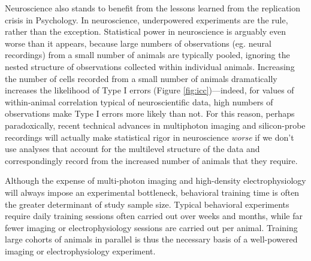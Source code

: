 \documentclass[nohyper, justified, notitlepage, marginals=raggedright,twoside=false,debug]{tufte-autopilot}
\begin{document}
Neuroscience also stands to benefit from the lessons learned from the replication crisis in Psychology\citep{shroutPsychologyScienceKnowledge2018}. In neuroscience, underpowered experiments are the rule, rather than the exception\citep{buttonPowerFailureWhy2013}. Statistical power in neuroscience is arguably even worse than it appears, because large numbers of observations (eg. neural recordings) from a small number of animals are typically pooled, ignoring the nested structure of observations collected within individual animals. Increasing the number of cells recorded from a small number of animals dramatically increases the likelihood of Type I errors (Figure \ref{fig:icc})---indeed, for values of within-animal correlation typical of neuroscientific data, high numbers of observations make Type I errors more likely than not\citep{aartsSolutionDependencyUsing2014}. For this reason, perhaps paradoxically, recent technical advances in multiphoton imaging and silicon-probe recordings will actually make statistical rigor in neuroscience \textit{worse} if we don't use analyses that account for the multilevel structure of the data and correspondingly record from the increased number of animals that they require.




Although the expense of multi-photon imaging and high-density electrophysiology will always impose an experimental bottleneck, behavioral training time is often the greater determinant of study sample size. Typical behavioral experiments require daily training sessions often carried out over weeks and months, while far fewer imaging or electrophysiology sessions are carried out per animal.  Training large cohorts of animals in parallel is thus the necessary basis of a well-powered imaging or electrophysiology experiment.
\end{document}
